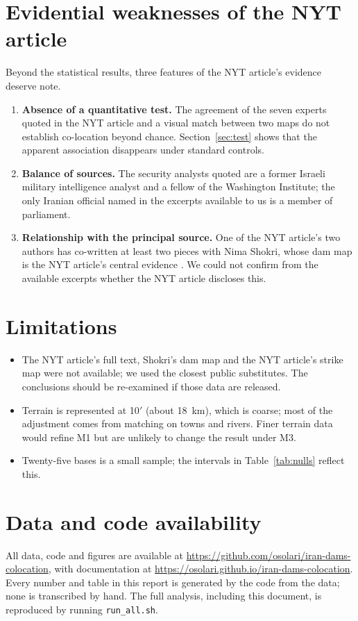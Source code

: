 \documentclass[numbered]{saim-blog}
\begin{document}
\section{Evidential weaknesses of the NYT article}
\label{sec:weak}
Beyond the statistical results, three features of the NYT article's evidence deserve note.
\begin{enumerate}
\item \textbf{Absence of a quantitative test.} The agreement of the seven experts quoted in the NYT article and a visual match between two maps do not establish co-location beyond chance. Section~\ref{sec:test} shows that the apparent association disappears under standard controls.
\item \textbf{Balance of sources.} The security analysts quoted are a former Israeli military intelligence analyst and a fellow of the Washington Institute; the only Iranian official named in the excerpts available to us is a member of parliament.
\item \textbf{Relationship with the principal source.} One of the NYT article's two authors has co-written at least two pieces with Nima Shokri, whose dam map is the NYT article's central evidence \citep{conversation_mahoozi_shokri}. We could not confirm from the available excerpts whether the NYT article discloses this.
\end{enumerate}

\section{Limitations}
\begin{itemize}
\item The NYT article's full text, Shokri's dam map and the NYT article's strike map were not available; we used the closest public substitutes. The conclusions should be re-examined if those data are released.
\item Terrain is represented at 10$'$ (about 18~km), which is coarse; most of the adjustment comes from matching on towns and rivers. Finer terrain data would refine M1 but are unlikely to change the result under M3.
\item Twenty-five bases is a small sample; the intervals in Table~\ref{tab:nulls} reflect this.
\end{itemize}

\section*{Data and code availability}
All data, code and figures are available at \url{https://github.com/osolari/iran-dams-colocation}, with documentation at \url{https://osolari.github.io/iran-dams-colocation}. Every number and table in this report is generated by the code from the data; none is transcribed by hand. The full analysis, including this document, is reproduced by running \texttt{run\_all.sh}.
\end{document}
